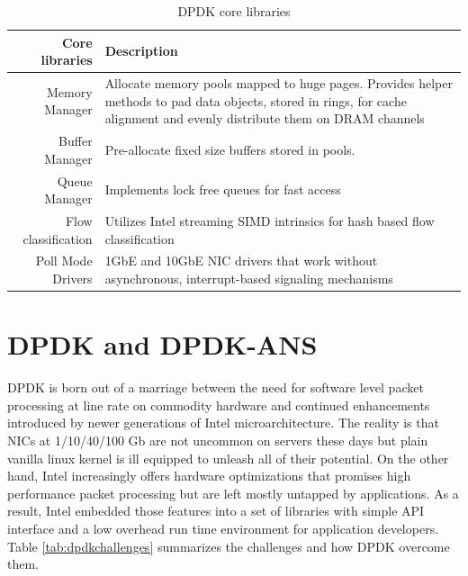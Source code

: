 \documentclass{sig-alternate-05-2015}
\begin{document}
\vspace*{-10pt}
\begin{table}[]
\centering
\caption{DPDK core libraries}
\label{tab:dpdkcorelibs}
\begin{tabular}{|r|p{2in}|}
\hline
Core libraries      & Description                                                                                                                                       \\ \hline
Memory Manager      & Allocate memory pools mapped to huge pages. Provides helper methods to pad data objects, stored in rings, for cache alignment and evenly distribute them on DRAM channels \\ \hline
Buffer Manager      & Pre-allocate fixed size buffers stored in pools.                                                                                                  \\ \hline
Queue Manager       & Implements lock free queues for fast access                                                                                                       \\ \hline
Flow classification & Utilizes Intel streaming SIMD intrinsics for hash based flow classification                                                                       \\ \hline
Poll Mode Drivers    & 1GbE and 10GbE NIC drivers that work without asynchronous, interrupt-based signaling mechanisms                                                   \\ \hline
\end{tabular}
\end{table}


\section{DPDK and DPDK-ANS}
DPDK is born out of a marriage between the need for software level packet processing at line rate on commodity hardware and continued enhancements introduced by newer generations of Intel microarchitecture. The reality is that NICs at 1/10/40/100 Gb are not uncommon on servers these days but plain vanilla linux kernel is ill equipped to unleash all of their potential. On the other hand, Intel increasingly offers hardware optimizations that promises high performance packet processing but are left mostly untapped by applications. As a result, Intel embedded those features into a set of libraries with simple API interface and a low overhead run time environment for application developers. Table \ref{tab:dpdkchallenges} summarizes the challenges and how DPDK overcome them. \cite{dpdk:presentation}
\end{document}
